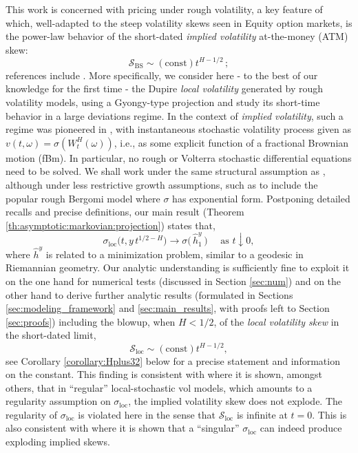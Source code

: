\documentclass[11pt]{article}
\theoremstyle{plain}
\theoremstyle{definition}
\theoremstyle{remark}
\renewcommand{\hat}{\widehat}
\newcommand{\1}{\mathbf{1}}
\newcommand{\Sbs}{\mathcal{S}_\mathrm{BS}}
\newcommand{\Sloc}{\mathcal{S}_\mathrm{loc}}
\numberwithin{equation}{section}
\def\sigDup{\sigma_\mathrm{loc}}
\begin{document}
This work is concerned with pricing under rough volatility, a key feature of which, well-adapted to the steep volatility skews seen in Equity option markets, is the power-law behavior
of the short-dated {\em implied volatility} at-the-money (ATM) skew: 
$$
                \Sbs \sim \mathrm{(const)} t^{H-1/2} \,;
$$
references include \cite{alos2007short, fukasawa2011asymptotic, bayer2016pricing, bayer2017short, forde2017asymptotics, euch2018short, fukasawa2017short, friz2021short, GULISASHVILI20203648, fukasawa2020,BHP21}.
More specifically, we consider here - to the best of our knowledge for the first time - the Dupire {\em local volatility} \cite{dupire1996unified,dupire1994pricing} generated by rough volatility models, using a Gyongy-type projection \cite{GyongyMimicking, BrunickShreve} and study its short-time behavior in a large deviations regime. In the context of {\em implied volatility}, such a regime was pioneered in \cite{forde2017asymptotics}, with instantaneous stochastic volatility process given as $v(t,\omega) = \sigma( W^H_t (\omega))$, i.e., as some explicit function of a fractional Brownian motion (fBm). In particular, no rough or Volterra stochastic differential equations need to be solved. We shall work under the same structural assumption as \cite{forde2017asymptotics}, although under less restrictive growth assumptions, such as to include the popular rough Bergomi model \cite{bayer2016pricing} where $\sigma$ has exponential form.  Postponing detailed recalls and precise definitions, our main result (Theorem \ref{th:asymptotic:markovian:projection}) states that, 
$$
       \sigDup \bigl(t, y \, t^{1/2-H} \bigr) %
\to \sigma \bigl(\, \hat{h}_1^y \, \bigr)
\quad \mbox{ as } t \downarrow 0,
$$
where $\hat{h}^y$ is related to a minimization problem, similar to a geodesic in Riemannian geometry.
Our analytic understanding is sufficiently fine to exploit it on the one hand for numerical tests  (discussed in Section \ref{sec:num}) 
and on the other hand to derive further analytic results (formulated in Sections \ref{sec:modeling_framework} and \ref{sec:main_results}, 
with proofs left to Section \ref{sec:proofs}) 
including the blowup, when $H < 1/2$, of the {\em local volatility skew} in the short-dated limit,
$$
                \Sloc \sim \mathrm{(const)} t^{H-1/2},
$$
see Corollary \ref{corollary:Hplus32} below for a precise statement and information on the constant.
This finding is consistent with \cite{fukasawa2017short} where it is shown, amongst others, that in ``regular'' local-stochastic vol models, which amounts to a regularity assumption on $\sigDup$, the implied volatility skew does not explode. 
The regularity of $\sigDup$ is violated here in the sense that $\Sloc$ is infinite at $t=0$. This is also consistent with \cite{pig19,fps2020} where it is shown that a  ``singular'' $\sigDup$ can indeed produce exploding implied skews. 
\end{document}

